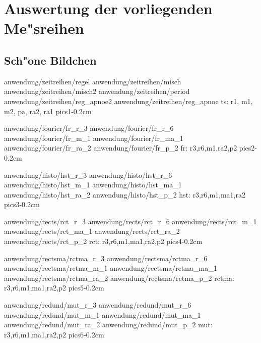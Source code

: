 \section{Auswertung der vorliegenden Me"sreihen}

\subsection{Sch"one Bildchen}

\epsfigsix
{anwendung/zeitreihen/regel}
{anwendung/zeitreihen/misch}
{anwendung/zeitreihen/misch2}
{anwendung/zeitreihen/period}
{anwendung/zeitreihen/reg_apnoe2}
{anwendung/zeitreihen/reg_apnoe}
{ts: r1, m1, m2, pa, ra2, ra1 }{pics1}{-0.2cm}

\epsfigsix
{anwendung/fourier/fr_r_3}
{anwendung/fourier/fr_r_6}
{anwendung/fourier/fr_m_1}
{anwendung/fourier/fr_ma_1}
{anwendung/fourier/fr_ra_2}
{anwendung/fourier/fr_p_2}
{fr: r3,r6,m1,ra2,p2 }{pics2}{-0.2cm}

\epsfigsix
{anwendung/histo/hst_r_3}
{anwendung/histo/hst_r_6}
{anwendung/histo/hst_m_1}
{anwendung/histo/hst_ma_1}
{anwendung/histo/hst_ra_2}
{anwendung/histo/hst_p_2}
{hst: r3,r6,m1,ma1,ra2 }{pics3}{-0.2cm}

\epsfigsix
{anwendung/rects/rct_r_3}
{anwendung/rects/rct_r_6}
{anwendung/rects/rct_m_1}
{anwendung/rects/rct_ma_1}
{anwendung/rects/rct_ra_2}
{anwendung/rects/rct_p_2}
{rct: r3,r6,m1,ma1,ra2,p2 }{pics4}{-0.2cm}

\epsfigsix
{anwendung/rectsma/rctma_r_3}
{anwendung/rectsma/rctma_r_6}
{anwendung/rectsma/rctma_m_1}
{anwendung/rectsma/rctma_ma_1}
{anwendung/rectsma/rctma_ra_2}
{anwendung/rectsma/rctma_p_2}
{rctma: r3,r6,m1,ma1,ra2,p2 }{pics5}{-0.2cm}

\epsfigsix
{anwendung/redund/mut_r_3}
{anwendung/redund/mut_r_6}
{anwendung/redund/mut_m_1}
{anwendung/redund/mut_ma_1}
{anwendung/redund/mut_ra_2}
{anwendung/redund/mut_p_2}
{mut: r3,r6,m1,ma1,ra2,p2 }{pics6}{-0.2cm}



